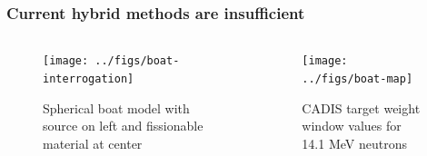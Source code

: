 \documentclass[xcolor=x11names,compress, handout]{beamer}
\renewcommand{\(}{\begin{columns}}
\renewcommand{\)}{\end{columns}}
\newcommand{\<}[1]{\begin{column}{#1}}
\renewcommand{\>}{\end{column}}
\begin{document}
\begin{frame}[fragile]
  \frametitle{Current hybrid methods are insufficient}

	\begin{columns}
  	\begin{column}{0.5\textwidth}
 	 \begin{center}
 	 \begin{figure}
 	 \texttt{[image: ../figs/boat-interrogation]}  
 	 \caption{Spherical boat model with source on left and fissionable material at center}
 	 \end{figure}
 	 \end{center}
  	\end{column}
 	\begin{column}{0.5\textwidth}
 	 \begin{center}
 	 \begin{figure}
 	 \texttt{[image: ../figs/boat-map]}  
 	 \caption{CADIS target weight window values for 14.1 MeV neutrons}
 	 \end{figure}
 	 \end{center}
  	\end{column}
	\end{columns}




\end{frame}
\end{document}
